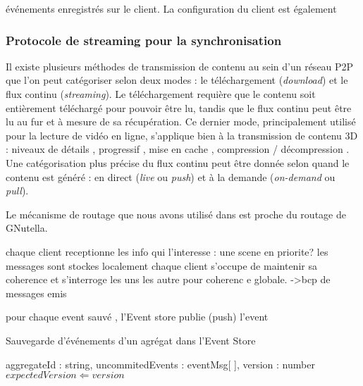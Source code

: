 événements enregistrés sur le client. La configuration du client est également 


\subsubsection{Protocole de streaming pour la synchronisation}
\label{streamingprotocol}

Il existe plusieurs méthodes de transmission de contenu au sein d'un réseau 
\gls{P2P} que l'on peut catégoriser selon deux modes : le téléchargement 
(\textit{download}) 
et le flux continu (\textit{streaming}). Le téléchargement requière que le contenu 
soit entièrement téléchargé pour pouvoir être lu, tandis que le flux continu peut 
être lu au fur et à mesure de sa récupération. Ce dernier mode, principalement 
utilisé pour la lecture de vidéo en ligne, s'applique bien à la transmission de 
contenu \gls{3D} : niveaux de détails \cite{Chu2012,Hu2008}, progressif 
\cite{Cheng2009,Limper2014}, mise en cache \cite{Jia2014}, compression / 
décompression
\cite{Lavoue2013,Ponchio2015,Maglo2013a}. 
Une catégorisation plus précise du flux continu peut être donnée selon quand le 
contenu est généré : 
en direct (\textit{live} ou \textit{push}) et à la demande (\textit{on-demand} ou 
\textit{pull}).  


Le mécanisme de routage que nous avons utilisé dans \cite{Desprat2015a} est 
proche du routage de GNutella. 


chaque client receptionne les info qui l’interesse : une scene en priorite?
les messages sont stockes localement
chaque client s’occupe de maintenir sa coherence
et s’interroge les uns les autre pour coherenc e globale.
->bcp de messages emis


pour chaque event sauvé , l’Event store publie (push) l’event

\begin{algorithm} %
	\caption{Sauvegarde d'événements d'un agrégat dans l'Event Store} %
	\label{algo:saveEvent} %
	\begin{algorithmic} %
		\REQUIRE aggregateId : string, uncommitedEvents : eventMsg[ ], 
		version : number
		\STATE $expectedVersion \Leftarrow version$
		\ENDFOR
	\end{algorithmic}
\end{algorithm}

